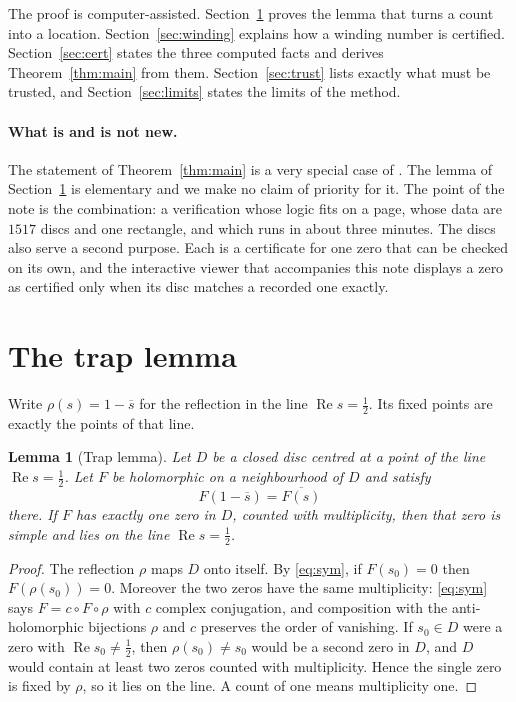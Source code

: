 \documentclass[11pt,a4paper]{article}
\newtheorem{lemma}[theorem]{Lemma}
\theoremstyle{definition}
\newcommand{\conj}[1]{\overline{#1}}
\DeclareMathOperator{\re}{Re}
\begin{document}
The proof is computer-assisted. Section~\ref{sec:lemma} proves the lemma that
turns a count into a location. Section~\ref{sec:winding} explains how a
winding number is certified. Section~\ref{sec:cert} states the three computed
facts and derives Theorem~\ref{thm:main} from them. Section~\ref{sec:trust}
lists exactly what must be trusted, and Section~\ref{sec:limits} states the
limits of the method.

\paragraph{What is and is not new.}
The statement of Theorem~\ref{thm:main} is a very special case of
\cite{PlattTrudgian}. The lemma of Section~\ref{sec:lemma} is elementary and
we make no claim of priority for it. The point of the note is the combination:
a verification whose logic fits on a page, whose data are $1517$ discs and one
rectangle, and which runs in about three minutes. The discs also serve a
second purpose. Each is a certificate for one zero that can be checked on its
own, and the interactive viewer that accompanies this note displays a zero as
certified only when its disc matches a recorded one exactly.

\section{The trap lemma}\label{sec:lemma}

Write $\rho(s)=1-\conj{s}$ for the reflection in the line $\re s=\tfrac12$.
Its fixed points are exactly the points of that line.

\begin{lemma}[Trap lemma]\label{lem:trap}
Let $D$ be a closed disc centred at a point of the line $\re s=\tfrac12$.
Let $F$ be holomorphic on a neighbourhood of $D$ and satisfy
\begin{equation}\label{eq:sym}
  F(1-\conj{s})=\conj{F(s)}
\end{equation}
there. If $F$ has exactly one zero in $D$, counted with multiplicity, then
that zero is simple and lies on the line $\re s=\tfrac12$.
\end{lemma}

\begin{proof}
The reflection $\rho$ maps $D$ onto itself. By \eqref{eq:sym}, if $F(s_0)=0$
then $F(\rho(s_0))=0$. Moreover the two zeros have the same multiplicity:
\eqref{eq:sym} says $F=c\circ F\circ\rho$ with $c$ complex conjugation, and
composition with the anti-holomorphic bijections $\rho$ and $c$ preserves the
order of vanishing. If $s_0\in D$ were a zero with $\re s_0\neq\tfrac12$, then
$\rho(s_0)\neq s_0$ would be a second zero in $D$, and $D$ would contain at
least two zeros counted with multiplicity. Hence the single zero is fixed by
$\rho$, so it lies on the line. A count of one means multiplicity one.
\end{proof}
\end{document}
